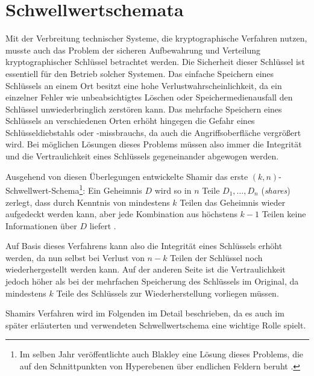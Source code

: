 \section{Schwellwertschemata}

\label{sec_basics_threshold}


Mit der Verbreitung technischer Systeme, die kryptographische Verfahren nutzen, musste auch das Problem der sicheren Aufbewahrung und Verteilung kryptographischer Schlüssel betrachtet werden. Die Sicherheit dieser Schlüssel ist essentiell für den Betrieb solcher Systemen. Das einfache Speichern eines Schlüssels an einem Ort besitzt eine hohe Verlustwahrscheinlichkeit, da ein einzelner Fehler wie unbeabsichtigtes Löschen oder Speichermedienausfall den Schlüssel unwiederbringlich zerstören kann. Das mehrfache Speichern eines Schlüssels an verschiedenen Orten erhöht hingegen die Gefahr eines Schlüsseldiebstahls oder -missbrauchs, da auch die Angriffsoberfläche vergrößert wird. Bei möglichen Lösungen dieses Problems müssen also immer die Integrität und die Vertraulichkeit eines Schlüssels gegeneinander abgewogen werden. \cite{gemmell1997}

Ausgehend von diesen Überlegungen entwickelte Shamir das erste \((k,n)\)-Schwellwert-Schema\footnote{
  Im selben Jahr veröffentlichte auch Blakley eine Lösung dieses Problems, die auf den Schnittpunkten von Hyperebenen über endlichen Feldern beruht \cite{blakley1979}.
}: Ein Geheimnis \(D\) wird so in \(n\) Teile \(D_1, \dots, D_n\) (\textit{shares}) zerlegt, dass durch Kenntnis von mindestens \(k\) Teilen das Geheimnis wieder aufgedeckt werden kann, aber jede Kombination aus höchstens \(k-1\) Teilen keine Informationen über \(D\) liefert \cite{shamir1979}. 

Auf Basis dieses Verfahrens kann also die Integrität eines Schlüssels erhöht werden, da nun selbst bei Verlust von \(n-k\) Teilen der Schlüssel noch wiederhergestellt werden kann. Auf der anderen Seite ist die Vertraulichkeit jedoch höher als bei der mehrfachen Speicherung des Schlüssels im Original, da mindestens \(k\) Teile des Schlüssels zur Wiederherstellung vorliegen müssen.

Shamirs Verfahren wird im Folgenden im Detail beschrieben, da es auch im später erläuterten und verwendeten Schwellwertschema eine wichtige Rolle spielt.

